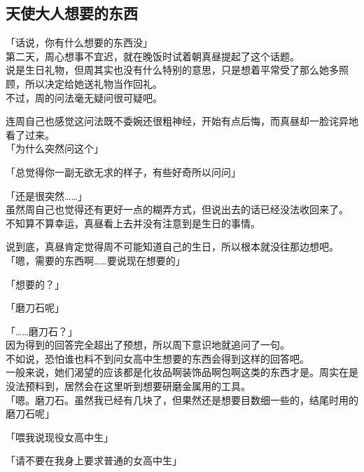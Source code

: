 \subsection{天使大人想要的东西}

「话说，你有什么想要的东西没」\\

第二天，周心想事不宜迟，就在晚饭时试着朝真昼提起了这个话题。\\

说是生日礼物，但周其实也没有什么特别的意思，只是想着平常受了那么她多照顾，所以决定给她送礼物当作回礼。\\

不过，周的问法毫无疑问很可疑吧。

连周自己也感觉这问法既不委婉还很粗神经，开始有点后悔，而真昼却一脸诧异地看了过来。\\

「为什么突然问这个」

「总觉得你一副无欲无求的样子，有些好奇所以问问」

「还是很突然……」\\

虽然周自己也觉得还有更好一点的糊弄方式，但说出去的话已经没法收回来了。\\

不知算不算幸运，真昼看上去并没有注意到是生日的事情。

说到底，真昼肯定觉得周不可能知道自己的生日，所以根本就没往那边想吧。\\

「嗯，需要的东西啊……要说现在想要的」

「想要的？」

「磨刀石呢」

「……磨刀石？」\\

因为得到的回答完全超出了预想，所以周下意识地就追问了一句。\\

不如说，恐怕谁也料不到问女高中生想要的东西会得到这样的回答吧。\\

一般来说，她们渴望的应该都是化妆品啊装饰品啊包啊这类的东西才是。周实在是没法预料到，居然会在这里听到想要研磨金属用的工具。\\

「嗯。磨刀石。虽然我已经有几块了，但果然还是想要目数细一些的，结尾时用的磨刀石呢」

「喂我说现役女高中生」

「请不要在我身上要求普通的女高中生」\\

